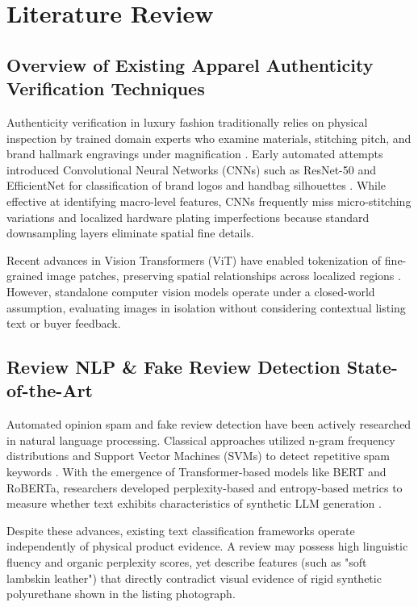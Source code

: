 \chapter{Literature Review}

\section{Overview of Existing Apparel Authenticity Verification Techniques}
Authenticity verification in luxury fashion traditionally relies on physical inspection by trained domain experts who examine materials, stitching pitch, and brand hallmark engravings under magnification \cite{smith2022computer}. Early automated attempts introduced Convolutional Neural Networks (CNNs) such as ResNet-50 and EfficientNet for classification of brand logos and handbag silhouettes \cite{patel2023deep}. While effective at identifying macro-level features, CNNs frequently miss micro-stitching variations and localized hardware plating imperfections because standard downsampling layers eliminate spatial fine details.

Recent advances in Vision Transformers (ViT) have enabled tokenization of fine-grained image patches, preserving spatial relationships across localized regions \cite{dosovitskiy2020image}. However, standalone computer vision models operate under a closed-world assumption, evaluating images in isolation without considering contextual listing text or buyer feedback.

\section{Review NLP & Fake Review Detection State-of-the-Art}
Automated opinion spam and fake review detection have been actively researched in natural language processing. Classical approaches utilized n-gram frequency distributions and Support Vector Machines (SVMs) to detect repetitive spam keywords \cite{jindal2008opinion}. With the emergence of Transformer-based models like BERT and RoBERTa, researchers developed perplexity-based and entropy-based metrics to measure whether text exhibits characteristics of synthetic LLM generation \cite{devlin2018bert, zhang2023nlp}.

Despite these advances, existing text classification frameworks operate independently of physical product evidence. A review may possess high linguistic fluency and organic perplexity scores, yet describe features (such as "soft lambskin leather") that directly contradict visual evidence of rigid synthetic polyurethane shown in the listing photograph.

